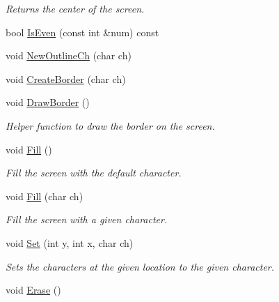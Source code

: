 \begin{DoxyCompactItemize}
\begin{DoxyCompactList}\small\item\em Returns the center of the screen. \end{DoxyCompactList}\item 
bool \hyperlink{classScreen_af7a18ec4e53fb371293e9ebcc23b7e2b}{Is\-Even} (const int \&num) const 
\item 
void \hyperlink{classScreen_a27dcfac6e64ab72059d0801dd9714d7a}{New\-Outline\-Ch} (char ch)
\item 
void \hyperlink{classScreen_a2ba1e54cb2fee7f246a25aed46c3ff3f}{Create\-Border} (char ch)
\item 
\hypertarget{classScreen_a146a94183c6c610ae8a619521fc9d102}{void \hyperlink{classScreen_a146a94183c6c610ae8a619521fc9d102}{Draw\-Border} ()}\label{classScreen_a146a94183c6c610ae8a619521fc9d102}

\begin{DoxyCompactList}\small\item\em Helper function to draw the border on the screen. \end{DoxyCompactList}\item 
\hypertarget{classScreen_a8cf89892a333f7d6e7227ffdf77b3351}{void \hyperlink{classScreen_a8cf89892a333f7d6e7227ffdf77b3351}{Fill} ()}\label{classScreen_a8cf89892a333f7d6e7227ffdf77b3351}

\begin{DoxyCompactList}\small\item\em Fill the screen with the default character. \end{DoxyCompactList}\item 
\hypertarget{classScreen_aeeebb297b5f39c2b25ee026df8fec9ac}{void \hyperlink{classScreen_aeeebb297b5f39c2b25ee026df8fec9ac}{Fill} (char ch)}\label{classScreen_aeeebb297b5f39c2b25ee026df8fec9ac}

\begin{DoxyCompactList}\small\item\em Fill the screen with a given character. \end{DoxyCompactList}\item 
void \hyperlink{classScreen_ab035671163a5cabee7611c7c456b1c56}{Set} (int y, int x, char ch)
\begin{DoxyCompactList}\small\item\em Sets the characters at the given location to the given character. \end{DoxyCompactList}\item 
\hypertarget{classScreen_a7e2c21a6e63390eb3d8b46ee85af05d2}{void \hyperlink{classScreen_a7e2c21a6e63390eb3d8b46ee85af05d2}{Erase} ()}\label{classScreen_a7e2c21a6e63390eb3d8b46ee85af05d2}


\end{DoxyCompactItemize}

